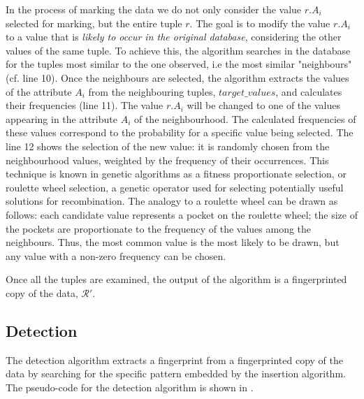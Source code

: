 \documentclass[runningheads]{llncs}
\begin{document}
In the process of marking the data we do not only consider the value $r.A_i$ selected for marking, but the entire tuple $r$. 
The goal is to modify the value $r.A_i$ to a value that is \textit{likely to occur in the original database}, considering the other values of the same tuple. 
To achieve this, the algorithm searches in the database for the tuples most similar to the one observed, i.e the most similar "neighbours" (cf. line 10).
Once the neighbours are selected, the algorithm extracts the values of the attribute $A_i$ from the neighbouring tuples, $target\_values$, and calculates their frequencies (line 11).
The value $r.A_i$ will be changed to one of the values appearing in the attribute $A_i$ of the neighbourhood. The calculated frequencies of these values correspond to the probability for a specific value being selected.
The line 12 shows the selection of the new value: it is randomly chosen from the neighbourhood values, weighted by the frequency of their occurrences. 
This technique is known in genetic algorithms as a fitness proportionate selection, or roulette wheel selection, a genetic operator used for selecting potentially useful solutions for recombination.
The analogy to a roulette wheel can be drawn as follows: each candidate value represents a pocket on the roulette wheel; the size of the pockets are proportionate to the frequency of the values among the neighbours.
Thus, the most common value is the most likely to be drawn, but any value with a non-zero frequency can be chosen.

Once all the tuples are examined, the output of the algorithm is a fingerprinted copy of the data, $\mathcal{R'}$.

\subsection{Detection}
The detection algorithm extracts a fingerprint from a fingerprinted copy of the data by searching for the specific pattern embedded by the insertion algorithm. 
The pseudo-code for the detection algorithm is shown in .
\end{document}
